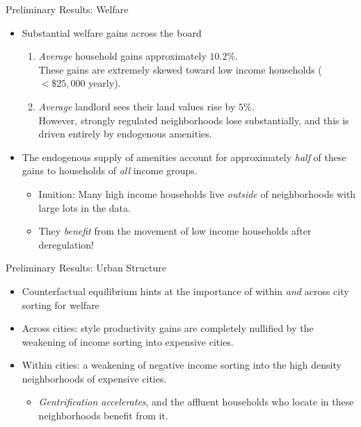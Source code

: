 \documentclass{beamer}
\begin{document}
\begin{frame}{Preliminary Results: Welfare}
	\begin{itemize}
		\color{black}
		\itemsep1em
		\pause
		\item Substantial welfare gains across the board
		\begin{enumerate}
			\itemsep1em
			\item \textit{Average} household gains approximately $10.2 \%$. \\ These gains are extremely skewed toward low income households ($< \$25,000$ yearly). \pause
			
			
			\item \textit{Average} landlord sees their land values rise by $5 \%$. \\
			However, strongly regulated neighborhoods lose substantially, and this is driven entirely by endogenous amenities. 
		\end{enumerate} \pause
		
		
		\item The endogenous supply of amenities account for approximately \textit{half} of these gains to households of \textit{all} income groups.
		\begin{itemize}
			\item Inuition: Many high income households live \textit{outside} of neighborhoods with large lots in the data.
			\item They \textit{benefit} from the movement of low income households after deregulation!
		\end{itemize}
	\end{itemize}
\end{frame}		
		
	\begin{frame}{Preliminary Results: Urban Structure}
		\begin{itemize}
			\color{black}
			\itemsep1em
		\item Counterfactual equilibrium hints at the importance of within \textit{and} across city sorting for welfare 
		
		\item \color{purple} Across \color{black} cities: \cite{hseihmoretti} style productivity gains are \color{red} completely nullified \color{black} by the \color{red} weakening \color{black} of income sorting into expensive cities.
			
		\item \color{purple} Within \color{black} cities: a \color{red} weakening \color{black} of \color{red} negative income sorting \color{black} into the high density neighborhoods of expensive cities.
		\begin{itemize}
			\itemsep1em
			\item \textit{Gentrification accelerates}, and the affluent households who locate in these neighborhoods benefit from it.
		\end{itemize}
	\end{itemize}
\end{frame}
\end{document}
